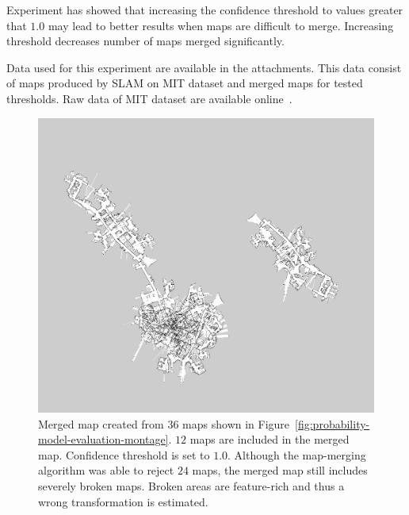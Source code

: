 Experiment has showed that increasing the confidence threshold to values greater that $1.0$ may lead to better results when maps are difficult to merge. Increasing threshold decreases number of maps merged significantly.

Data used for this experiment are available in the attachments. This data consist of maps produced by \gls{SLAM} on \gls{MIT} dataset and merged maps for tested thresholds. Raw data of \gls{MIT} dataset are available online~\cite{Fallon2013}.

\begin{figure}
    \centering
    \includegraphics[width=\textwidth]{../img/probability-model-evaluation-treshold_1_0-12maps.png}
    \caption[The merged map created with confidence threshold $1.0$.]{Merged map created from $36$ maps shown in Figure~\ref{fig:probability-model-evaluation-montage}. $12$ maps are included in the merged map. Confidence threshold is set to $1.0$. Although the map-merging algorithm was able to reject $24$ maps, the merged map still includes severely broken maps. Broken areas are feature-rich and thus a wrong transformation is estimated.}
    \label{fig:probability-model-evaluation-treshold_1.0-12maps}
\end{figure}
